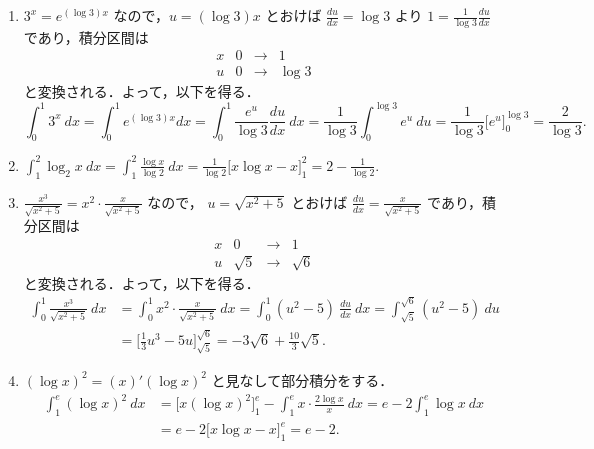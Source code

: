 \documentclass[11pt, uplatex, dvipdfmx]{jsarticle}
\newcommand{\ds}{\displaystyle}
\begin{document}
\begin{enumerate}[(1)]
   \item $\ds 3^x  = e^{(\log 3) x}$ なので，$u=(\log 3) x$ とおけば $\frac{du}{dx}=\log 3$ より
     $1 = \frac{1}{\log 3} \frac{du}{dx}$ であり，積分区間は
     \[
       \begin{array}{c|ccc}
         x & 0 & \to & 1\\ \hline
         u & 0 & \to & \log 3
       \end{array}
     \]
     と変換される．よって，以下を得る．
     \[
       \int_{0}^{1} 3^x \ dx = \int_{0}^{1} e^{(\log 3)x}  dx = \int_{0}^{1}
       \frac{e^u}{\log 3} \frac{du}{dx} \ dx =\frac{1}{\log 3} \int_{0}^{\log
         3} e^{u} \ du = \frac{1}{\log 3} \Big[ e^{u} \Big]_{0}^{\log 3} =
       \frac{2}{\log 3}.
     \]

   \item $\ds \int_{1}^{2} \log_2 x \ dx = \int_{1}^{2} \frac{\log x}{\log 2}
     \ dx = \frac{1}{\log 2} \Big[ x \log x - x\Big]_{1}^{2} = 2 -\frac{1}{\log 2}.$

   \item $\ds \frac{x^3}{\sqrt{x^2+5}} =  x^2 \cdot \frac{x}{\sqrt{x^2+5}}$ なので，
     $u=\sqrt{x^2+5}$ とおけば $\frac{du}{dx}=\frac{x}{\sqrt{x^2+5}}$ であり，積分区間は
     \[
       \begin{array}{c|ccc}
         x & 0 & \to & 1 \\ \hline
         u & \sqrt{5} & \to & \sqrt{6}
       \end{array}
     \]
     と変換される．よって，以下を得る．
     \[
       \begin{aligned}
         \int_{0}^{1}\frac{x^3}{\sqrt{x^2+5}} \ dx &=\int_{0}^{1} x^2 \cdot \frac{x}{\sqrt{x^2+5}} \ dx
           = \int_{0}^{1} (u^2-5) \ \frac{du}{dx} \ dx
         =\int_{\sqrt{5}}^{\sqrt{6}} (u^2-5) \ du \\
         &= \Big[ \frac{1}{3}u^3 - 5u \Big]_{\sqrt{5}}^{\sqrt{6}}
         = -3\sqrt{6} + \frac{10}{3}\sqrt{5}.
       \end{aligned}
     \]

   \item $\left( \log x\right)^2 = \left( x \right)' \left( \log x\right)^2$ と見なして部分積分をする．
     \begin{align*}
       \int_1^e \left( \log x \right)^2 \ dx 
       & = \Big[ x \left(\log x\right)^2 \Big]_{1}^{e} - \int_{1}^{e} x \cdot \frac{2 \log x}{x} \ dx
        =e - 2\int_{1}^{e} \log x \ dx\\
       & = e- 2\Big[ x \log x - x \Big]_{1}^{e}= e-2.
     \end{align*}


\end{enumerate}
\end{document}
